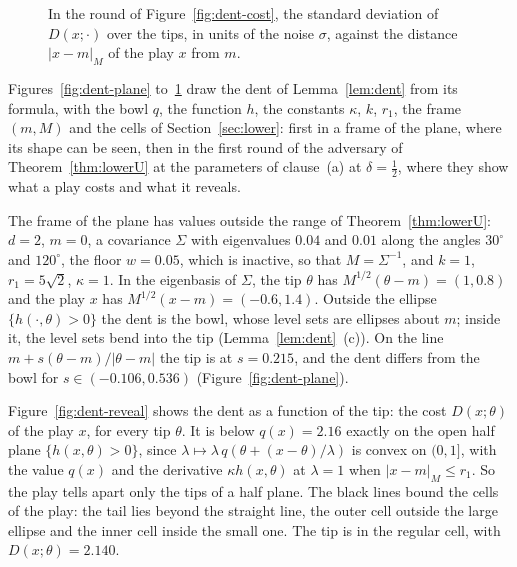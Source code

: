\documentclass[11pt]{amsart}
\newcommand{\figdir}{figdata}
\theoremstyle{definition}
\numberwithin{equation}{section}
\begin{document}
\begin{figure}[t]
\centering
{}
\caption{In the round of Figure~\ref{fig:dent-cost}, the standard deviation of $D(x;\cdot)$ over the tips, in units of the noise $\sigma$, against the distance $|x-m|_M$ of the play $x$ from $m$.}\label{fig:dent-info}
\end{figure}

Figures~\ref{fig:dent-plane} to~\ref{fig:dent-info} draw the dent of Lemma~\ref{lem:dent} from its formula, with the bowl $q$, the function $h$, the constants $\kappa$, $k$, $r_1$, the frame $(m,M)$ and the cells of Section~\ref{sec:lower}: first in a frame of the plane, where its shape can be seen, then in the first round of the adversary of Theorem~\ref{thm:lowerU} at the parameters of clause~(a) at $\delta=\frac12$, where they show what a play costs and what it reveals.

The frame of the plane has values outside the range of Theorem~\ref{thm:lowerU}: $d=2$, $m=0$, a covariance $\Sigma$ with eigenvalues $0.04$ and $0.01$ along the angles $30^\circ$ and $120^\circ$, the floor $w=0.05$, which is inactive, so that $M=\Sigma^{-1}$, and $k=1$, $r_1=5\sqrt2$, $\kappa=1$. In the eigenbasis of $\Sigma$, the tip $\theta$ has $M^{1/2}(\theta-m)=(1,0.8)$ and the play $x$ has $M^{1/2}(x-m)=(-0.6,1.4)$. Outside the ellipse $\{h(\cdot,\theta)>0\}$ the dent is the bowl, whose level sets are ellipses about $m$; inside it, the level sets bend into the tip (Lemma~\ref{lem:dent}~(c)). On the line $m+s(\theta-m)/|\theta-m|$ the tip is at $s=0.215$, and the dent differs from the bowl for $s\in(-0.106,0.536)$ (Figure~\ref{fig:dent-plane}).

Figure~\ref{fig:dent-reveal} shows the dent as a function of the tip: the cost $D(x;\theta)$ of the play $x$, for every tip $\theta$. It is below $q(x)=2.16$ exactly on the open half plane $\{h(x,\theta)>0\}$, since $\lambda\mapsto\lambda\,q(\theta+(x-\theta)/\lambda)$ is convex on $(0,1]$, with the value $q(x)$ and the derivative $\kappa h(x,\theta)$ at $\lambda=1$ when $|x-m|_M\le r_1$. So the play tells apart only the tips of a half plane. The black lines bound the cells of the play: the tail lies beyond the straight line, the outer cell outside the large ellipse and the inner cell inside the small one. The tip is in the regular cell, with $D(x;\theta)=2.140$.
\end{document}
